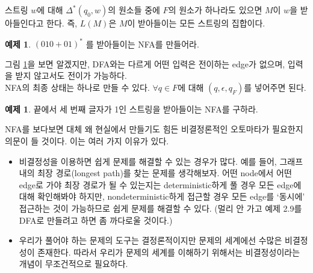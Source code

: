 \documentclass[b5paper, 10pt]{book}
\theoremstyle{definition}
\newtheorem{ex}[defn]{예제}
\begin{document}
스트링 $w$에 대해 $\Delta^* (q_0, w)$의 원소들 중에 $F$의 원소가 하나라도 있으면
$M$이 $w$을 받아들인다고 한다. 즉, $L(M)$은 $M$이 받아들이는 모든 스트링의 집합이다. 
\begin{ex} \label{010+01}
    $(010+01)^*$ 를 받아들이는 NFA를 만들어라.
\end{ex} 
\begin{figure}[ht]
    \centering
    \caption{} 
    \label{(010+01)^*}
\end{figure}
그림 \ref{(010+01)^*}을 보면 알겠지만, DFA와는 다르게 어떤 입력은 전이하는 edge가
없으며, 입력을 받지 않고서도 전이가 가능하다.\\
NFA의 최종 상태는 하나로 만들 수 있다. $\forall q \in F$에 대해 $(q, \epsilon, q_F )$를
넣어주면 된다.
\begin{ex}
    끝에서 세 번째 글자가 1인 스트링을 받아들이는 NFA를 구하라. 
\end{ex}
NFA를 보다보면 대체 왜 현실에서 만들기도 힘든
비결정론적인 오토마타가 필요한지 의문이 들 것이다. 이는 여러 가지 이유가 있다.
\begin{itemize}
    \item 비결정성을 이용하면 쉽게 문제를 해결할 수 있는 경우가 많다.
    예를 들어, 그래프 내의 최장 경로(longest path)를 찾는 문제를 생각해보자.
    어떤 node에서 어떤 edge로 가야 최장 경로가 될 수 있는지는 deterministic하게
    풀 경우 모든 edge에 대해 확인해봐야 하지만, nondeterministic하게 접근할 경우
    모든 edge를 `동시에' 접근하는 것이 가능하므로 쉽게 문제를 해결할 수 있다. (멀리
    안 가고 예제 2.9를 DFA로 만들려고 하면 좀 까다로울 것이다.)
    \item 우리가 풀어야 하는 문제의 도구는 결정론적이지만 문제의 세계에선 수많은
    비결정성이 존재한다. 따라서 우리가 문제의 세계를 이해하기 위해서는 비결정성이라는
    개념이 무조건적으로 필요하다.
\end{itemize}
\end{document}
